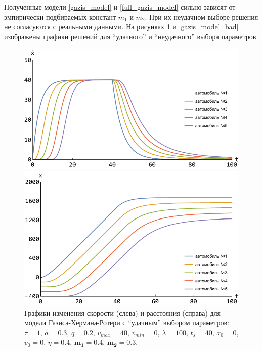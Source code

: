 \documentclass[12pt, a4paper]{extarticle}
\numberwithin{equation}{section}
\numberwithin{figure}{section}
\begin{document}
Полученные модели \eqref{gazis_model} и \eqref{full_gazis_model} сильно зависят от эмпирически подбираемых констант $m_1$ и $m_2$. При их неудачном выборе решения не согласуются с реальными данными. На рисунках \ref{gazis_model_good} и \ref{gazis_model_bad} изображены графики решений для ``удачного'' и ``неудачного'' выбора параметров. 
\begin{figure}[h!]
	\begin{center}
		\begin{minipage}[h!]{0.48\linewidth}
			\includegraphics[width=1\linewidth,height=0.2\textheight]
			{Images/gazis_model_good_speed.pdf}
		\end{minipage}
		\hfill 
		\begin{minipage}[h!]{0.48\linewidth}
			\includegraphics[width=1\linewidth,height=0.2\textheight]
			{Images/gazis_model_good_distance.pdf}
		\end{minipage}
		\caption{Графики изменения скорости (слева) и расстояния (справа) для модели Газиса-Хермана-Ротери с ``удачным'' выбором параметров: $\tau=1$, $a=0.3$, $q=0.2$, $v_{max}=40$, $v_{min}=0$, $\lambda=100$, $t_s=40$, $x_0=0$, $v_0=0$, $\eta=0.4$, $\boldsymbol{m_1=0.4}$, $\boldsymbol{m_2=0.3}$.}
		\label{gazis_model_good}
	\end{center}
\end{figure}
\end{document}
